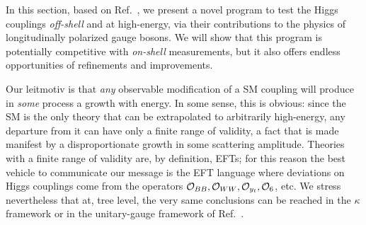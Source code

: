 \label{sec4:hwh}

In this section, based on Ref.~\cite{Henning:2018kys}, we present a novel program to test the Higgs couplings \emph{off-shell} and at high-energy, via their contributions to the physics of longitudinally polarized gauge bosons. We will show that this program is potentially competitive with \emph{on-shell} measurements, but it also offers endless opportunities of refinements and improvements. 


Our leitmotiv is that \emph{any} observable modification of a SM coupling will produce in \emph{some} process a growth with energy. In some sense, this is obvious: since the SM is the only theory that can be extrapolated to arbitrarily high-energy, any departure from it can have only a finite range of validity, a fact that is made manifest by a disproportionate growth in some scattering amplitude. Theories with a finite range of validity are, by definition, EFTs; for this reason the best vehicle to communicate our message is  the EFT language where deviations on Higgs couplings come from the operators $\mathcal{O}_{BB},\mathcal{O}_{WW},\mathcal{O}_{y_t},\mathcal{O}_{6}$, etc. We stress nevertheless that at, tree level, the very same conclusions can be reached in the $\kappa$ framework \cite{Heinemeyer:2013tqa} or in the unitary-gauge framework of Ref.~\cite{deFlorian:2016spz,Gupta:2014rxa}.



